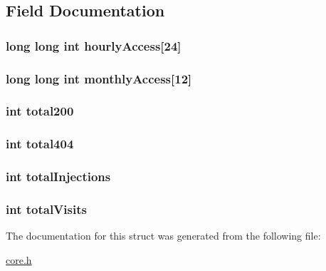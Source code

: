 \subsection{Field Documentation}
\hypertarget{struct_statistics_a5d2c00ae7b41276b97cf4a2be29001c1}{
\subsubsection[{hourly\-Access}]{\setlength{\rightskip}{0pt plus 5cm}long long int hourly\-Access\mbox{[}24\mbox{]}}}\label{struct_statistics_a5d2c00ae7b41276b97cf4a2be29001c1}
\hypertarget{struct_statistics_ad0d0d2ffdddb1d6259d24ee70abfd4c4}{
\subsubsection[{monthly\-Access}]{\setlength{\rightskip}{0pt plus 5cm}long long int monthly\-Access\mbox{[}12\mbox{]}}}\label{struct_statistics_ad0d0d2ffdddb1d6259d24ee70abfd4c4}
\hypertarget{struct_statistics_a3d9f2a6c24570236f6edd05dff804d03}{
\subsubsection[{total200}]{\setlength{\rightskip}{0pt plus 5cm}int total200}}\label{struct_statistics_a3d9f2a6c24570236f6edd05dff804d03}
\hypertarget{struct_statistics_a62d495d9811a2a8a3c0d9d3b4cc201f0}{
\subsubsection[{total404}]{\setlength{\rightskip}{0pt plus 5cm}int total404}}\label{struct_statistics_a62d495d9811a2a8a3c0d9d3b4cc201f0}
\hypertarget{struct_statistics_aefcb67879169684ac40167225767bdbe}{
\subsubsection[{total\-Injections}]{\setlength{\rightskip}{0pt plus 5cm}int total\-Injections}}\label{struct_statistics_aefcb67879169684ac40167225767bdbe}
\hypertarget{struct_statistics_a730b68baeee01715620647f348bb789f}{
\subsubsection[{total\-Visits}]{\setlength{\rightskip}{0pt plus 5cm}int total\-Visits}}\label{struct_statistics_a730b68baeee01715620647f348bb789f}


The documentation for this struct was generated from the following file\-:\begin{DoxyCompactItemize}
\item 
\hyperlink{core_8h}{core.\-h}\end{DoxyCompactItemize}
